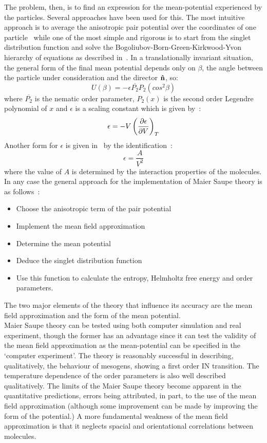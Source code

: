The problem, then, is to find an expression for the mean-potential experienced by the particles. 
Several approaches have been used for this. The most intuitive approach is to average the anisotropic 
pair potential over the coordinates of one  particle~\cite{HumphriesJames71} while one of the most
simple and rigorous is to start from the singlet distribution function and solve the
Bogoliubov-Born-Green-Kirkwood-Yvon hierarchy of equations as described in~\cite{greenBook}. 
In a translationally invariant situation, the general form of the final mean potential depends only
on $\beta$, the angle between the particle under consideration and the director $\mathbf{\hat{n} }$, so:
\begin{equation}
	U(\beta) = -\epsilon \overline{P_2} P_2(cos^2\beta)
\end{equation}
where $\overline{P_2}$ is the nematic order parameter, $P_2(x)$ is the second order Legendre
polynomial of $x$ and $\epsilon$ is a scaling constant which is given by~:
\begin{equation}
	\epsilon = -V\left(\frac{\partial \epsilon}{\partial V}\right)_T
\end{equation}
Another form for $\epsilon$ is given in~\cite{Intro_LC} by the identification~:
\begin{equation}
	\epsilon = \frac{A}{V^2}
\end{equation}
where the value of $A$ is determined by the interaction properties of the molecules.
In any case the general approach for the implementation of Maier Saupe theory is as follows~:
\begin{itemize}
	\item Choose the anisotropic term of the pair potential
	\item Implement the mean field approximation
	\item Determine the mean potential
	\item Deduce the singlet distribution function
	\item Use this function to calculate the entropy, Helmholtz free energy and order parameters.
\end{itemize}
The two major elements of the theory that influence its accuracy are the mean field 
approximation and the form of the mean potential.\\

Maier Saupe theory can be tested using both computer simulation and real experiment, though
 the former has an advantage since it can test the validity of the mean field approximation 
as the mean-potential can be specified in the `computer experiment'. The theory is reasonably
successful in describing, qualitatively, the behaviour of mesogens, showing a first order IN
transition. The temperature dependence of the order 
parameters is also well described qualitatively. The limits of the Maier Saupe theory become 
apparent in the quantitative predictions, errors being attributed, in part, to the use of 
the mean field approximation (although some improvement can be made by improving the form of the 
potential.) A more fundamental weakness of the mean field approximation is that it neglects
spacial and orientational correlations between molecules.\\

